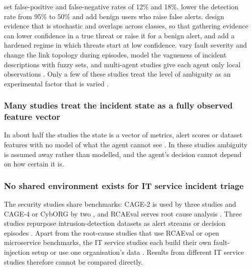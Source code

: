 \documentclass[pdflatex,sn-basic]{sn-jnl}
\begin{document}
\citet{koupaei2026} set false-positive and false-negative rates of 12\% and 18\%. \citet{contractor2025} lower the detection rate from 95\% to 50\% and add benign users who raise false alerts. \citet{sahin2026} design evidence that is stochastic and overlaps across classes, so that gathering evidence can lower confidence in a true threat or raise it for a benign alert, and add a hardened regime in which threats start at low confidence. \citet{wu2026} vary fault severity and change the link topology during episodes, \citet{peralta2025} model the vagueness of incident descriptions with fuzzy sets, and multi-agent studies give each agent only local observations \citep{aenugu2026,ravi2025}. Only a few of these studies treat the level of ambiguity as an experimental factor that is varied \citep{contractor2025,sahin2026,wu2026}.

\subsubsection{Many studies treat the incident state as a fully observed feature vector}

In about half the studies the state is a vector of metrics, alert scores or dataset features with no model of what the agent cannot see \citep{saeed2025,noorulhassan2026,alturkistani2022,bhosale2026,raj2026,nimmathi2026,yuan2026,babar2026,hughes2022,jaber2025,singh2026,ghanem2026,dunsin2025,wang2024mrca,ding2023}. In these studies ambiguity is assumed away rather than modelled, and the agent's decision cannot depend on how certain it is.

\subsubsection{No shared environment exists for IT service incident triage}

The security studies share benchmarks: CAGE-2 is used by three studies \citep{hammar2026belief,hammar2025,nyberg2024} and CAGE-4 or CybORG by two \citep{castro2025,contractor2025}, and RCAEval serves root cause analysis \citep{rojasrodriguez2026}. Three studies repurpose intrusion-detection datasets as alert streams or decision episodes \citep{okafor2026,kovtun2026,alturkistani2022}. Apart from the root-cause studies that use RCAEval or open microservice benchmarks, the IT service studies each build their own fault-injection setup or use one organisation's data \citep{peralta2025,wang2023hrlhf,ding2023,wu2026,yuan2026}. Results from different IT service studies therefore cannot be compared directly.
\end{document}
